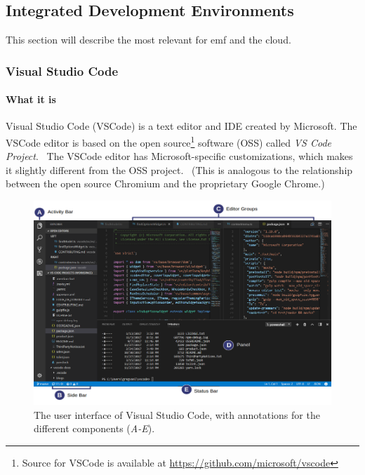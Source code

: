 \subsection{Integrated Development Environments}\label{sec:editors}

This section will describe the most relevant  for \acrlong{emf} and the \gls{cloud}.

\subsubsection{Visual Studio Code}\label{sec:vscode}

\paragraph*{What it is}
Visual Studio Code (\gls{VSCode}) is a text editor and \acrfull{IDE} created by
Microsoft. The VSCode editor is based on the \gls{open source}\footnote{Source for VSCode is available at \href{https://github.com/microsoft/vscode}{https://github.com/microsoft/vscode}} software (OSS) called \emph{VS Code Project}.~\cite{helmingEclipseTheiaIDE2019} 
The VSCode editor has Microsoft-specific customizations, which makes it slightly different from the OSS project.~\cite{MicrosoftVscode2020} (This is analogous to the relationship between the \gls{open source} Chromium and the proprietary Google Chrome.)

\begin{figure}[htbp]
  \centering
  \includegraphics[width=\textwidth]{figures/vscode-ui}
  \caption[Visual Studio Code User Interface]{The user interface of Visual Studio Code, with annotations for the different components (\emph{A-E}).\cite{microsoftVisualStudioCode2020}}\label{fig:vscode-ui}
\end{figure}


